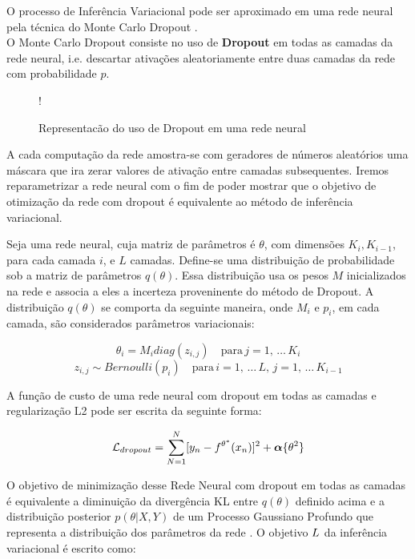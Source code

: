 O processo de Inferência Variacional pode ser aproximado em uma rede neural pela técnica do Monte Carlo Dropout \citep{dropbayes}. \\

O Monte Carlo Dropout consiste no uso de \textbf{Dropout} em todas as camadas da rede
neural, i.e. descartar ativações aleatoriamente entre duas camadas da rede com
probabilidade $p$.\\

\begin{figure}
  \centering
  \resizebox {\columnwidth} {!} {}
  \label{fig:dropout}
  \caption{Representacão do uso de Dropout em uma rede neural}
\end{figure}


A cada computação da rede amostra-se com geradores de números aleatórios uma
máscara que ira zerar valores de ativação entre camadas subsequentes. Iremos
reparametrizar a rede neural com o fim de poder mostrar que o objetivo de
otimização da rede com dropout é equivalente ao método de inferência variacional.

Seja uma rede neural, cuja matriz de parâmetros é $\theta$, com dimensões
$K_i,K_{i-1}$, para cada camada $i$, e $L$ camadas. Define-se uma distribuição
de probabilidade sob a matriz de parâmetros $q(\theta)$.
Essa distribuição usa os pesos $M$ inicializados na rede e associa a eles a incerteza proveninente do
método de Dropout. A distribuição $q(\theta)$ se comporta da seguinte maneira,
onde $M_i$ e $p_i$, em cada camada, são considerados parâmetros variacionais:

\newcommand{\diag}{\mathop{\mathrm{diag}}}

\[
  \theta_i   = M_i   diag (z_{i,j}) \quad \text{para} \, j=1, \, \dots  \,K_i
\] 
\[
  z_{i,j}  \sim Bernoulli(p_i) \quad  \text{para} \, i=1, \, \dots \, L, \, j=1, \, \dots \, K_{i-1}
\]   


A função de custo de uma rede neural com dropout em todas as camadas  e
regularização L2 pode ser escrita da seguinte forma:

\[     \mathcal{L}_{dropout} = \sum^N_{N=1} [y_n - \mathnormal{f}^{\theta^*}(x_n)]^2 + \boldsymbol{\alpha}\{\theta^2\} \]


O objetivo de minimização desse Rede Neural com dropout em todas as camadas é
equivalente a diminuição da divergência KL entre $q(\theta)$ definido acima e a distribuição
posterior $p(\theta | X,Y)$ de um Processo Gaussiano Profundo que representa a
distribuição dos parâmetros da rede \citep{dropbayes}. O objetivo
$\mathnormal{L}$ da inferência variacional é escrito como:

